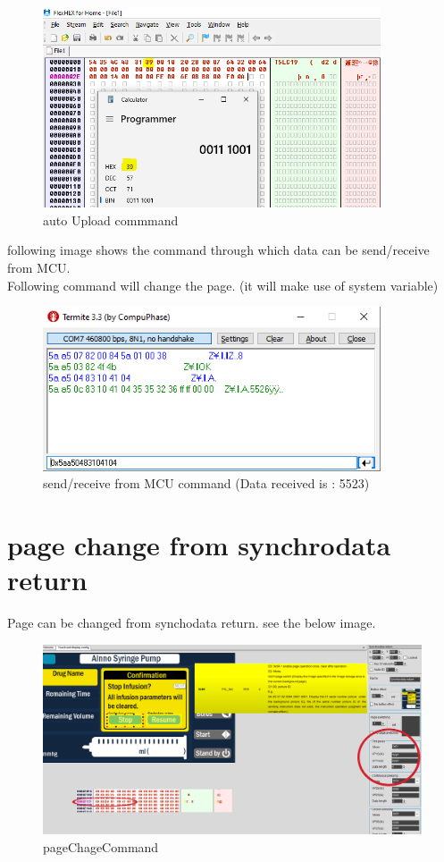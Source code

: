 \documentclass[12pt, A4]{article} %
\begin{document}
\begin{figure}[!htb] %
	\centering
	\includegraphics[width=10cm]{autoupload} 
	\caption{auto Upload commmand}
\end{figure}

following image shows the command through which data can be send/receive from MCU. 
\\ Following command will change the page. (it will make use of system variable)


\begin{figure}[!htb] %
	\centering
	\includegraphics[width=10cm]{receive} 
	\caption{send/receive from MCU command (Data received is : 5523)}
\end{figure}

\newpage


\section{page change from synchrodata return}

Page can be changed from synchodata return. see the below image.

\begin{figure}[!htb] %
	\centering
	\includegraphics[width=14cm]{pageChageCommand} 
	\caption{pageChageCommand}
\end{figure}
\end{document}
